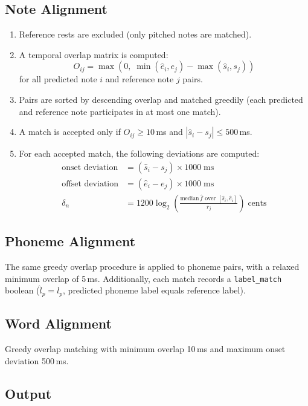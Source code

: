 \documentclass[11pt,letterpaper]{article}
\newcommand{\fh}{\hat{f}}
\newcommand{\sh}{\hat{s}}
\newcommand{\eh}{\hat{e}}
\begin{document}
\subsection{Note Alignment}

\begin{enumerate}[noitemsep]
  \item Reference rests are excluded (only pitched notes are matched).
  \item A temporal overlap matrix is computed:
        \[
          O_{ij} = \max\!\left(0,\;
            \min(\eh_i, e_j) - \max(\sh_i, s_j)
          \right)
        \]
        for all predicted note $i$ and reference note $j$ pairs.
  \item Pairs are sorted by descending overlap and matched greedily (each
        predicted and reference note participates in at most one match).
  \item A match is accepted only if
        $O_{ij} \ge 10$\,ms and
        $|\sh_i - s_j| \le 500$\,ms.
  \item For each accepted match, the following deviations are computed:
        \begin{align*}
          \text{onset deviation} &= (\sh_i - s_j) \times 1000 \;\text{ms}\\
          \text{offset deviation} &= (\eh_i - e_j) \times 1000 \;\text{ms}\\
          \delta_n &= 1200 \log_2\!\left(
            \frac{\text{median}\,\fh \text{ over }[\sh_i,\eh_i]}{r_j}
          \right) \;\text{cents}
        \end{align*}
\end{enumerate}

\subsection{Phoneme Alignment}

The same greedy overlap procedure is applied to phoneme pairs, with a
relaxed minimum overlap of 5\,ms.
Additionally, each match records a \texttt{label\_match} boolean
($\hat{l}_p = l_p$, predicted phoneme label equals reference label).

\subsection{Word Alignment}

Greedy overlap matching with minimum overlap 10\,ms and maximum onset
deviation 500\,ms.

\subsection{Output}
\end{document}
